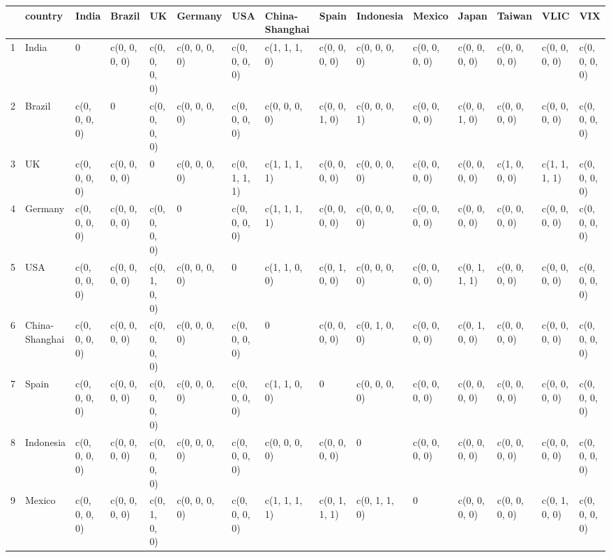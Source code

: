 \begin{table}[ht]
\centering
\begin{tabular}{lllllllllllllll}
  \hline
 & country & India & Brazil & UK & Germany & USA & China-Shanghai & Spain & Indonesia & Mexico & Japan & Taiwan & VLIC & VIX \\ 
  \hline
1 & India &             0 & c(0, 0, 0, 0) & c(0, 0, 0, 0) & c(0, 0, 0, 0) & c(0, 0, 0, 0) & c(1, 1, 1, 0) & c(0, 0, 0, 0) & c(0, 0, 0, 0) & c(0, 0, 0, 0) & c(0, 0, 0, 0) & c(0, 0, 0, 0) & c(0, 0, 0, 0) & c(0, 0, 0, 0) \\ 
  2 & Brazil & c(0, 0, 0, 0) &             0 & c(0, 0, 0, 0) & c(0, 0, 0, 0) & c(0, 0, 0, 0) & c(0, 0, 0, 0) & c(0, 0, 1, 0) & c(0, 0, 0, 1) & c(0, 0, 0, 0) & c(0, 0, 1, 0) & c(0, 0, 0, 0) & c(0, 0, 0, 0) & c(0, 0, 0, 0) \\ 
  3 & UK & c(0, 0, 0, 0) & c(0, 0, 0, 0) &             0 & c(0, 0, 0, 0) & c(0, 1, 1, 1) & c(1, 1, 1, 1) & c(0, 0, 0, 0) & c(0, 0, 0, 0) & c(0, 0, 0, 0) & c(0, 0, 0, 0) & c(1, 0, 0, 0) & c(1, 1, 1, 1) & c(0, 0, 0, 0) \\ 
  4 & Germany & c(0, 0, 0, 0) & c(0, 0, 0, 0) & c(0, 0, 0, 0) &             0 & c(0, 0, 0, 0) & c(1, 1, 1, 1) & c(0, 0, 0, 0) & c(0, 0, 0, 0) & c(0, 0, 0, 0) & c(0, 0, 0, 0) & c(0, 0, 0, 0) & c(0, 0, 0, 0) & c(0, 0, 0, 0) \\ 
  5 & USA & c(0, 0, 0, 0) & c(0, 0, 0, 0) & c(0, 1, 0, 0) & c(0, 0, 0, 0) &             0 & c(1, 1, 0, 0) & c(0, 1, 0, 0) & c(0, 0, 0, 0) & c(0, 0, 0, 0) & c(0, 1, 1, 1) & c(0, 0, 0, 0) & c(0, 0, 0, 0) & c(0, 0, 0, 0) \\ 
  6 & China-Shanghai & c(0, 0, 0, 0) & c(0, 0, 0, 0) & c(0, 0, 0, 0) & c(0, 0, 0, 0) & c(0, 0, 0, 0) &             0 & c(0, 0, 0, 0) & c(0, 1, 0, 0) & c(0, 0, 0, 0) & c(0, 1, 0, 0) & c(0, 0, 0, 0) & c(0, 0, 0, 0) & c(0, 0, 0, 0) \\ 
  7 & Spain & c(0, 0, 0, 0) & c(0, 0, 0, 0) & c(0, 0, 0, 0) & c(0, 0, 0, 0) & c(0, 0, 0, 0) & c(1, 1, 0, 0) &             0 & c(0, 0, 0, 0) & c(0, 0, 0, 0) & c(0, 0, 0, 0) & c(0, 0, 0, 0) & c(0, 0, 0, 0) & c(0, 0, 0, 0) \\ 
  8 & Indonesia & c(0, 0, 0, 0) & c(0, 0, 0, 0) & c(0, 0, 0, 0) & c(0, 0, 0, 0) & c(0, 0, 0, 0) & c(0, 0, 0, 0) & c(0, 0, 0, 0) &             0 & c(0, 0, 0, 0) & c(0, 0, 0, 0) & c(0, 0, 0, 0) & c(0, 0, 0, 0) & c(0, 0, 0, 0) \\ 
  9 & Mexico & c(0, 0, 0, 0) & c(0, 0, 0, 0) & c(0, 1, 0, 0) & c(0, 0, 0, 0) & c(0, 0, 0, 0) & c(1, 1, 1, 1) & c(0, 1, 1, 1) & c(0, 1, 1, 0) &             0 & c(0, 0, 0, 0) & c(0, 0, 0, 0) & c(0, 1, 0, 0) & c(0, 0, 0, 0) \\ 

\end{tabular}
\end{table}
